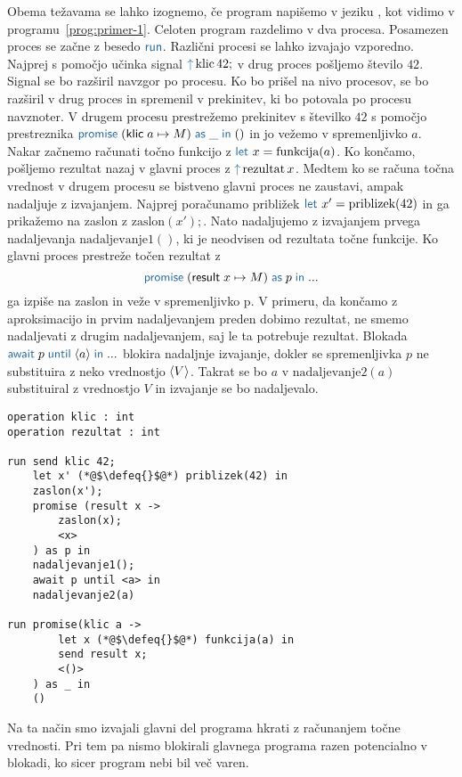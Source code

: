Obema težavama se lahko izognemo, če program napišemo v jeziku \aeff, kot vidimo v programu~\ref{prog:primer-1}. Celoten program razdelimo v dva procesa. Posamezen proces se začne z besedo $\tmkw{run}$. Različni procesi se lahko izvajajo vzporedno.
Najprej s pomočjo učinka signal $\tmkw{\uparrow}\, \text{klic}\,42;$ v drug proces pošljemo število $42$. Signal se bo razširil navzgor po procesu. Ko bo prišel na nivo procesov, se bo razširil v drug proces in spremenil v prekinitev, ki bo potovala po procesu navznoter. V drugem procesu prestrežemo prekinitev s številko $42$ s pomočjo prestreznika $\tmwith{klic}{a}{M}{\_}{()}$ in jo vežemo v spremenljivko $a$. Nakar začnemo računati točno funkcijo z $\tmkw{let}\ x = \text{funkcija}(a)$. Ko končamo, pošljemo rezultat nazaj v glavni proces z $\tmkw{\uparrow}\, \text{rezultat}\,x$.
Medtem ko se računa točna vrednost v drugem procesu se bistveno glavni proces ne zaustavi, ampak nadaljuje z izvajanjem. Najprej poračunamo približek $\tmkw{let}\ x' = \text{priblizek}(42)$ in ga prikažemo na zaslon z $\text{zaslon}(x');$. Nato nadaljujemo z izvajanjem prvega nadaljevanja $\text{nadaljevanje}1()$, ki je neodvisen od rezultata točne funkcije. Ko glavni proces prestreže točen rezultat z $$\tmwith{result}{x}{M}{p}{...}$$ ga izpiše na zaslon in veže v spremenljivko p. V primeru, da končamo z aproksimacijo in prvim nadaljevanjem preden dobimo rezultat, ne smemo nadaljevati z drugim nadaljevanjem, saj le ta potrebuje rezultat. Blokada $\tmawait{p}{a}{...}$ blokira nadaljnje izvajanje, dokler se spremenljivka $p$ ne substituira z neko vrednostjo $\langle V \rangle$. Takrat se bo $a$ v $\text{nadaljevanje}2(a)$ substituiral z vrednostjo $V$ in izvajanje se bo nadaljevalo.

\begin{lstlisting}[caption={Asinhron Vzporeden primer.},label={prog:primer-1},float,floatplacement=H]
operation klic : int
operation rezultat : int

run send klic 42;
    let x' (*@$\defeq{}$@*) priblizek(42) in
    zaslon(x');
    promise (result x ->
    	zaslon(x);
    	<x>
    ) as p in
    nadaljevanje1();
    await p until <a> in
    nadaljevanje2(a)

run promise(klic a ->
    	let x (*@$\defeq{}$@*) funkcija(a) in
    	send result x;
    	<()>
    ) as _ in
    ()
\end{lstlisting}

Na ta način smo izvajali glavni del programa hkrati z računanjem točne vrednosti. Pri tem pa nismo blokirali glavnega programa razen potencialno v blokadi, ko sicer program nebi bil več varen.